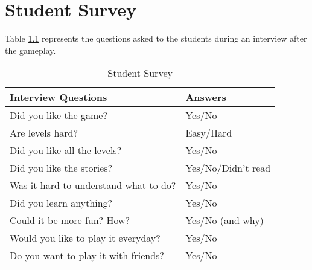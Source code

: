 
\chapter{Student Survey}
\label{ann:testSurveys}

Table \ref{tab:annex_table1} represents the questions asked to the students during an interview after the gameplay.
\begin{table}[H]
    \centering
    \caption{Student Survey}
    \label{tab:annex_table1}
    \begin{tabular}{|l|l|}
    \hline
        Interview Questions & Answers \\ \hline
        Did you like the game? & Yes/No \\ \hline
        Are levels hard? & Easy/Hard \\ \hline
        Did you like all the levels? & Yes/No \\ \hline
        Did you like the stories? & Yes/No/Didn't read \\ \hline
        Was it hard to understand what to do? & Yes/No \\ \hline
        Did you learn anything? & Yes/No \\ \hline
        Could it be more fun? How? & Yes/No (and why) \\ \hline
        Would you like to play it everyday? & Yes/No \\ \hline
        Do you want to play it with friends? & Yes/No \\ \hline
    \end{tabular}
\end{table}

\newpage